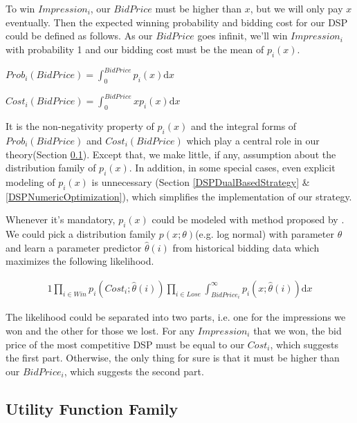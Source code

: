 \documentclass[sigconf]{acmart}
\begin{document}
To win $Impression_i$, our $BidPrice$ must be higher than $x$, but we will only pay $x$ eventually.
Then the expected winning probability and bidding cost for our DSP could be defined as follows.
As our $BidPrice$ goes infinit, we'll win $Impression_i$ with probability 1 and our bidding cost must be the mean of $p_i(x)$.

\begin{definition}
$Prob_i(BidPrice)= \int_0^{BidPrice} p_i(x) \mathrm{d} x$
\end{definition}

\begin{definition}
$Cost_i(BidPrice)= \int_0^{BidPrice} x p_i(x) \mathrm{d} x$
\end{definition}

It is the non-negativity property of $p_i(x)$ and the integral forms of $Prob_i(BidPrice)$ and $Cost_i(BidPrice)$
    which play a central role in our theory(Section \ref{UtilityFunctionFamily}).
Except that, we make little, if any, assumption about the distribution family of $p_i(x)$.
In addition, in some special cases, even explicit modeling of $p_i(x)$ is unnecessary
    (Section \ref{DSPDualBasedStrategy} \& \ref{DSPNumericOptimization}), which simplifies the implementation of our strategy.

Whenever it's mandatory, $p_i(x)$ could be modeled with method proposed by \cite{Wu2015}.
We could pick a distribution family $p(x; \theta)$(e.g. log normal) with parameter $\theta$ and
    learn a parameter predictor $\hat\theta(i)$ from historical bidding data which maximizes the following likelihood.

\begin{alignat}{1}
\prod\limits_{i \in Win} p_i(Cost_i; \hat\theta(i)) \prod\limits_{i \in Lose} \int_{BidPrice_i}^{\infty} p_i(x; \hat\theta(i)) \mathrm{d} x
\end{alignat}

The likelihood could be separated into two parts, i.e. one for the impressions we won and the other for those we lost.
For any $Impression_i$ that we won, the bid price of the most competitive DSP must be equal to our $Cost_i$, which suggests the first part.
Otherwise, the only thing for sure is that it must be higher than our $BidPrice_i$, which suggests the second part.

\subsection{Utility Function Family} \label{UtilityFunctionFamily}
\end{document}
